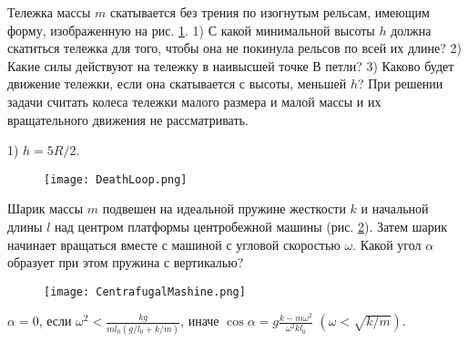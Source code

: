 \begin{ex} %
Тележка массы $m$ скатывается без трения по изогнутым рельсам, имеющим форму, изображенную на рис. \ref{DeathLoop}. 1) С какой минимальной высоты $h$ должна скатиться тележка для того, чтобы она не покинула рельсов по всей их длине? 2) Какие силы действуют на тележку в наивысшей точке $В$ петли? 3) Каково будет движение тележки, если она скатывается с высоты, меньшей $h$? При решении задачи считать колеса тележки малого размера и малой массы и их вращательного движения не рассматривать.
\begin{ans}
1) $h=5R/2$.
\end{ans}
\end{ex}	

\begin{figure}[h]
\centering
\texttt{[image: DeathLoop.png]}
\caption{}
\label{DeathLoop}
\end{figure}

\begin{ex} %
Шарик массы $m$ подвешен на идеальной пружине жесткости $k$ и начальной длины $l$ над центром платформы центробежной машины (рис. \ref{CentrafugalMashine}). Затем шарик начинает вращаться вместе с машиной с угловой скоростью $\omega$. Какой угол $\alpha$ образует при этом пружина с вертикалью?

\begin{figure}[h]
\centering
\texttt{[image: CentrafugalMashine.png]}
\caption{}
\label{CentrafugalMashine}
\end{figure}

\begin{ans}
$\alpha = 0$, если $\omega^2 < \frac{kg}{ml_0(g/l_0 + k/m)}$, иначе $\cos \alpha = g\frac{k-m\omega^2}{\omega^2kl_0}$ $\left( \omega < \sqrt{k/m} \right)$.
\end{ans}
\end{ex}	

\clearpage